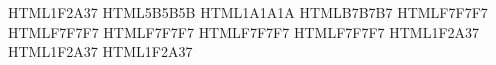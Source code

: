 %
%
\usepackage[dvipsnames, svgnames, table]{xcolor}

\definecolor{AzulPizarra}    {HTML}{1F2A37}   %
\definecolor{AzulMedio}      {HTML}{5B5B5B}   %
\definecolor{GrisCarbón}     {HTML}{1A1A1A}   %
\definecolor{GrisMedio}      {HTML}{B7B7B7}   %
\definecolor{GrisClaro}      {HTML}{F7F7F7}   %
\definecolor{AzulClaro}      {HTML}{F7F7F7}   %
\definecolor{Marfil}         {HTML}{F7F7F7}   %
\definecolor{VerdeSuave}     {HTML}{F7F7F7}   %
\definecolor{NaranjaSuave}   {HTML}{F7F7F7}   %
\definecolor{VerdeOliva}     {HTML}{1F2A37}   %
\definecolor{NaranjaTierra}  {HTML}{1F2A37}   %
\definecolor{RojoSuave}      {HTML}{1F2A37}   %
